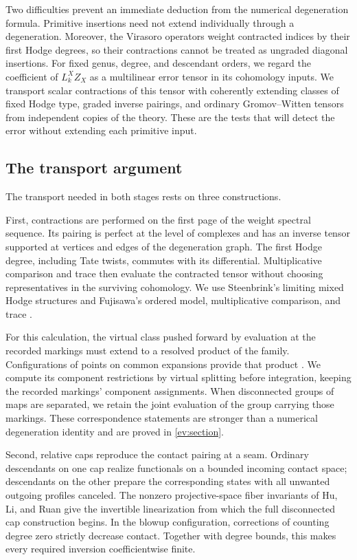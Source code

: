 Two difficulties prevent an immediate deduction from the numerical degeneration formula. Primitive insertions need not extend individually through a degeneration. Moreover, the Virasoro operators weight contracted indices by their first Hodge degrees, so their contractions cannot be treated as ungraded diagonal insertions. For fixed genus, degree, and descendant orders, we regard the coefficient of $L_k^X Z_X$ as a multilinear error tensor in its cohomology inputs. We transport scalar contractions of this tensor with coherently extending classes of fixed Hodge type, graded inverse pairings, and ordinary Gromov--Witten tensors from independent copies of the theory. These are the tests that will detect the error without extending each primitive input.

\subsection{The transport argument}

The transport needed in both stages rests on three constructions.

First, contractions are performed on the first page of the weight spectral sequence. Its pairing is perfect at the level of complexes and has an inverse tensor supported at vertices and edges of the degeneration graph. The first Hodge degree, including Tate twists, commutes with its differential. Multiplicative comparison and trace then evaluate the contracted tensor without choosing representatives in the surviving cohomology. We use Steenbrink's limiting mixed Hodge structures and Fujisawa's ordered model, multiplicative comparison, and trace \cite{Steenbrink1976,Steenbrink1977,Fujisawa2008,Fujisawa2014}.

For this calculation, the virtual class pushed forward by evaluation at the recorded markings must extend to a resolved product of the family. Configurations of points on common expansions provide that product \cite{AFConfigurations}. We compute its component restrictions by virtual splitting before integration, keeping the recorded markings' component assignments. When disconnected groups of maps are separated, we retain the joint evaluation of the group carrying those markings. These correspondence statements are stronger than a numerical degeneration identity and are proved in \cref{ev:section}.

Second, relative caps reproduce the contact pairing at a seam. Ordinary descendants on one cap realize functionals on a bounded incoming contact space; descendants on the other prepare the corresponding states with all unwanted outgoing profiles canceled. The nonzero projective-space fiber invariants of Hu, Li, and Ruan \cite{HLR2008} give the invertible linearization from which the full disconnected cap construction begins. In the blowup configuration, corrections of counting degree zero strictly decrease contact. Together with degree bounds, this makes every required inversion coefficientwise finite.

